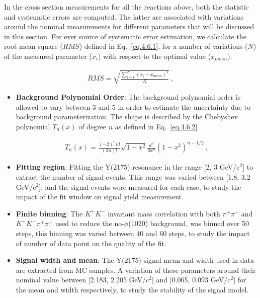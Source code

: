 In the cross section measurements for all the reactions above, both the statistic and systematic errors are computed.
The latter are associated with variations around the nominal measurements for different parameters that will be discussed in this section. For ever source of systematic error estimation, we calculate the root mean square ($RMS$) defined in Eq.~\ref{eq.4.6.1}, for a number of variations ($N$) of the measured parameter ($x_i$) with respect to the optimal value ($x_{mean}$).

\begin{equation}
    \label{eq.4.6.1}
    \begin{aligned}
        RMS = \sqrt{\frac{\sum\limits_{i=1}^{N} (x_i-x_{mean})^2}{N}}~,
    \end{aligned}
\end{equation}

\begin{itemize}
    \item \textbf{Background Polynomial Order}: The background polynomial order is allowed to vary between 3 and 5 in order to estimate the uncertainty due to background parameterization. The shape is described by the Chebyshev polynomial $T_n(x)$ of degree $n$ as defined in Eq.~\ref{eq.4.6.2}
 
    \begin{equation}
        \label{eq.4.6.2}
        \begin{aligned}
            T_n(x) = \frac{(-2)^{n}n!}{(2n)!}\sqrt{1-x^2}\frac{d^n}{dx^n}(1-x^2)^{n-1/2}~,
        \end{aligned}
    \end{equation}

    \item \textbf{Fitting region}: Fitting the Y(2175) resonance in the range [2, 3 GeV/c$^2$] to extract the number of signal events. This range was varied between [1.8, 3.2 GeV/c$^2$], and the signal events were measured for each case, to study the impact of the fit window on signal yield measurement.
    \item \textbf{Finite binning}: The $K^+K^-$ invariant mass correlation with both $\pi^+\pi^-$ and $K^+K^-\pi^+\pi^-$ used to reduce the no-$\phi$(1020) background, was binned over 50 steps, this binning was varied between 40 and 60 steps, to study the impact of number of data point on the quality of the fit.
    \item \textbf{Signal width and mean}: The Y(2175) signal mean and width used in data are extracted from MC samples. A variation of these parameters around their nominal value between [2.183, 2.205 GeV/c$^2$] and [0.065, 0.093 GeV/c$^2$] for the mean and width respectively, to study the stability of the signal model.
\end{itemize}

